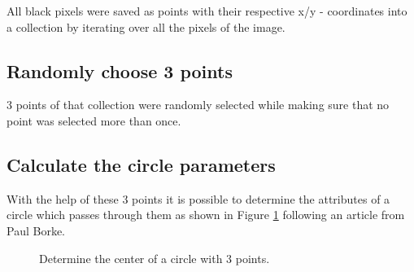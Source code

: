 All black pixels were saved as points with their respective x/y - coordinates into a collection by iterating over all the pixels of the image.

\subsection{Randomly choose 3 points}

3 points of that collection were randomly selected while making sure that no point was selected more than once.

\subsection{Calculate the circle parameters}

With the help of these 3 points it is possible to determine the attributes of a circle which passes through them as shown in Figure \ref{CalculateCircle} following an article from Paul Borke\cite{PaulBorke2020}.

\begin{figure}
	\centering
	\caption{Determine the center of a circle with 3 points.}
	\label{CalculateCircle}
\end{figure}

